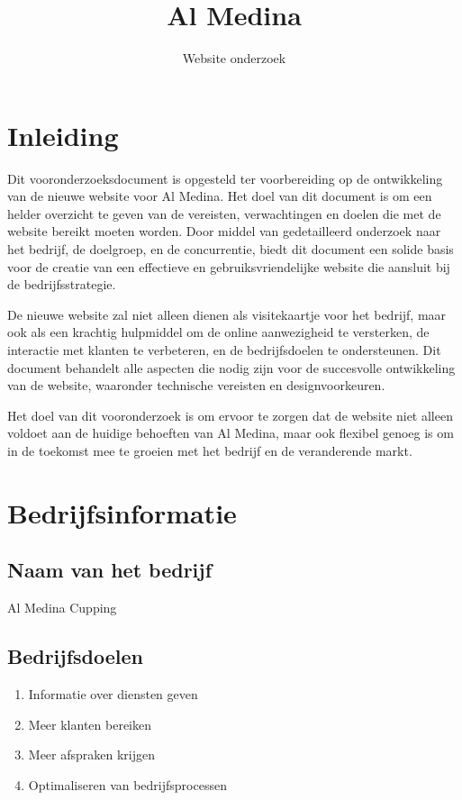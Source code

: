 \documentclass{article}
\title{Al Medina}
\author{Website onderzoek}
\begin{document}
\maketitle

\pagebreak

\tableofcontents

\pagebreak

\section*{Inleiding}
    
Dit vooronderzoeksdocument is opgesteld ter voorbereiding op de ontwikkeling van de nieuwe website voor Al Medina. Het doel van dit document is om een helder overzicht te geven van de vereisten, verwachtingen en doelen die met de website bereikt moeten worden. Door middel van gedetailleerd onderzoek naar het bedrijf, de doelgroep, en de concurrentie, biedt dit document een solide basis voor de creatie van een effectieve en gebruiksvriendelijke website die aansluit bij de bedrijfsstrategie.

De nieuwe website zal niet alleen dienen als visitekaartje voor het bedrijf, maar ook als een krachtig hulpmiddel om de online aanwezigheid te versterken, de interactie met klanten te verbeteren, en de bedrijfsdoelen te ondersteunen. Dit document behandelt alle aspecten die nodig zijn voor de succesvolle ontwikkeling van de website, waaronder technische vereisten en designvoorkeuren.

Het doel van dit vooronderzoek is om ervoor te zorgen dat de website niet alleen voldoet aan de huidige behoeften van Al Medina, maar ook flexibel genoeg is om in de toekomst mee te groeien met het bedrijf en de veranderende markt.

\pagebreak

\section{Bedrijfsinformatie}
\subsection{Naam van het bedrijf}
Al Medina Cupping
\subsection{Bedrijfsdoelen}
\begin{enumerate}
    \item Informatie over diensten geven
    \item Meer klanten bereiken
    \item Meer afspraken krijgen
    \item Optimaliseren van bedrijfsprocessen
\end{enumerate}
\end{document}
